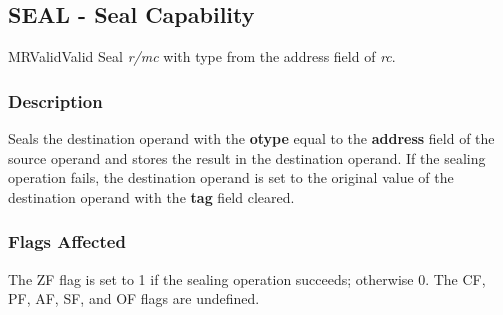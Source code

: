 \clearpage
{}
{}
\subsection*{SEAL - Seal Capability}

\begin{x86opcodetable}
  {MR}{Valid}{Valid}
  {Seal \emph{r/mc} with type from the address field of \emph{rc}}.
\end{x86opcodetable}

\begin{x86opentable}
\end{x86opentable}

\subsubsection*{Description}

Seals the destination operand with the \textbf{otype} equal to the
\textbf{address} field of the source operand and stores the result in
the destination operand.  If the sealing operation fails, the
destination operand is set to the original value of the destination
operand with the \textbf{tag} field cleared.

\subsubsection*{Flags Affected}

The ZF flag is set to 1 if the sealing operation succeeds; otherwise
0.  The CF, PF, AF, SF, and OF flags are undefined.
